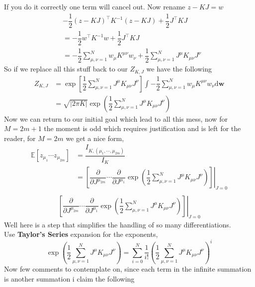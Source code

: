 \documentclass{scrartcl} %
\numberwithin{equation}{subsection}  %
\begin{document}
If you do it correctly one term will cancel out. Now rename $z - KJ = w$
\begin{align}
	&-\dfrac{1}{2}(z - KJ)^\top K^{-1} (z - KJ) + \dfrac{1}{2}J^\top KJ\\
	&= -\dfrac{1}{2}w^\top K^{-1}w + \dfrac{1}{2}J^\top KJ\\
	&= -\dfrac{1}{2}\sum\limits_{\mu,\nu = 1}^N w_{\mu}K^{\mu \nu}w_{\nu} + 
	\dfrac{1}{2}\sum\limits_{\mu,\nu = 1}^N J^{\mu}K_{\mu \nu} J^{\nu} 
\end{align}
So if we replace all this stuff back to our $Z_{K,J}$ we have the following
\begin{align}
	Z_{K,J} &= \exp\left[
	\dfrac{1}{2}\sum\limits_{\mu,\nu = 1}^N J^{\mu}K_{\mu \nu} J^{\nu}
\right]\int -\dfrac{1}{2}\sum\limits_{\mu,\nu = 1}^N w_{\mu}K^{\mu \nu}w_{\nu} \mathrm{d}\textbf{w} \\
		&= 
		\sqrt{|2\pi K|}\exp\left(\dfrac{1}{2}\sum\limits_{\mu,\nu = 1}^N J^{\mu}K_{\mu \nu} J^{\nu}\right)
\end{align}
Now we can return to our initial goal which lead to all this mess, now for $M = 2m + 1$ the moment is odd which requires
justification and is left for the reader, for $M = 2m$ we get a nice form,
\begin{align*}
	\mathbb{E}[z_{\mu_1}\cdots z_{\mu_{2m}}] &= \dfrac{I_{K,(\mu_1,\cdots,\mu_{2m})}}{I_K}\\
						 &= 
\left. \left[\dfrac{\partial}{\partial J^{\mu_{2m}}}\cdots\dfrac{\partial}{\partial J^{\mu_1}}\exp\left(\dfrac{1}{2}
		\sum\limits_{\mu,\nu = 1}^N J^{\mu}K_{\mu \nu} J^{\nu}\right)\right]\right|_{J=0}\\
\end{align*}
\newpage
\begin{align*}
\left. \left[\dfrac{\partial}{\partial J^{\mu_{2m}}}\cdots\dfrac{\partial}{\partial J^{\mu_1}}\exp\left(\dfrac{1}{2}
		\sum\limits_{\mu,\nu = 1}^N J^{\mu}K_{\mu \nu} J^{\nu}\right)\right]\right|_{J=0}
\end{align*}
Well here is a step that simplifies the handling of so many differentiations.\\
Use \textbf{Taylor's Series} expansion for
the exponents,
\begin{equation}
	\exp\left(\dfrac{1}{2}\sum\limits_{\mu,\nu = 1}^N J^{\mu}K_{\mu \nu} J^{\nu}\right) =
	\sum\limits_{i = 0}^N \dfrac{1}{i!}
	\left(\dfrac{1}{2}\sum\limits_{\mu,\nu = 1}^N J^{\mu}K_{\mu \nu} J^{\nu}\right)^i
\end{equation}
Now few comments to contemplate on, since each term in the infinite summation is another summation i claim the following
\end{document}
